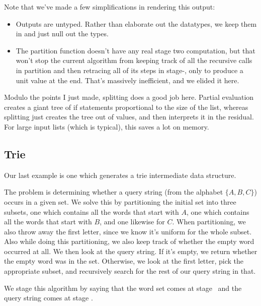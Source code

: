 Note that we've made a few simplifications in rendering this output:
\begin{itemize}
\item Outputs are untyped.  Rather than elaborate out the datatypes, we keep them in and just null out the types.
\item The partition function doesn't have any real stage two computation,
but that won't stop the current algorithm from keeping track of all the recursive calls in partition 
and then retracing all of its steps in stage-\bbtwo, only to produce a unit value at the end.  
That's massively inefficient, and we elided it here.
\end{itemize}

Modulo the points I just made, splitting does a good job here.  
Partial evaluation creates a giant tree of if statements proportional to the size of the list,
whereas splitting just creates the tree out of values, and then interprets it in the residual.
For large input lists (which is typical), this saves a lot on memory.

\subsection{Trie}

Our last example is one which generates a trie intermediate data structure.

The problem is determining whether a query string (from the alphabet $\{A, B,C\}$) occurs in a given set.
We solve this by partitioning the initial set into three subsets,
one which contains all the words that start with $A$,
one which contains all the words that start with $B$, and one likewise for $C$.
When partitioning, we also throw away the first letter, since we know it's uniform for the whole subset.
Also while doing this partitioning, we also keep track of whether the empty word occurred at all.
We then look at the query string.  If it's empty, we return whether the empty word was in the set.
Otherwise, we look at the first letter, pick the appropriate subset, 
and recursively search for the rest of our query string in that.

We stage this algorithm by saying that the word set comes at stage \bbone\
and the query string comes at stage \bbtwo.

